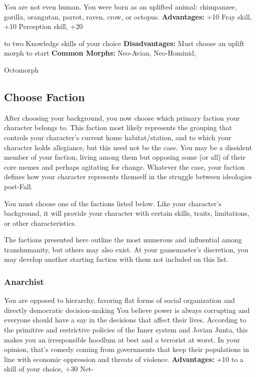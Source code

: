 You are not even human. You were born as an uplifted 
animal: chimpanzee, gorilla, orangutan, parrot, raven, 
crow, or octopus.
\textbf{Advantages:} +10 Fray skill, +10 Perception skill, +20 

to two Knowledge skills of your choice
\textbf{Disadvantages:} Must choose an uplift morph to start
\textbf{Common Morphs:} Neo-Avian, Neo-Hominid, 

Octomorph

\subsection{Choose Faction}

After choosing your background, you now choose 
which primary faction your character belongs to. 
This faction most likely represents the grouping that 
controls your character's current home habitat/station, 
and to which your character holds allegiance, but this 
need not be the case. You may be a dissident member 
of your faction, living among them but opposing some 
(or all) of their core memes and perhaps agitating for 
change. Whatever the case, your faction defines how 
your character represents themself in the struggle between
ideologies post-Fall.

You must choose one of the factions listed below. 
Like your character's background, it will provide your 
character with certain skills, traits, limitations, or 
other characteristics.

The factions presented here outline the most numerous
and influential among transhumanity, but others
may also exist. At your gamemaster's discretion, you 
may develop another starting faction with them not 
included on this list.

\subsubsection{Anarchist}

You are opposed to hierarchy, favoring flat forms of 
social organization and directly democratic decision-making
You believe power is always corrupting and
everyone should have a say in the decisions that affect 
their lives. According to the primitive and restrictive 
policies of the Inner system and Jovian Junta, this 
makes you an irresponsible hoodlum at best and a terrorist
at worst. In your opinion, that's comedy coming
from governments that keep their populations in line 
with economic oppression and threats of violence.
\textbf{Advantages:} +10 to a skill of your choice, +30 Net-

